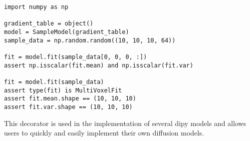 \begin{verbatim}
import numpy as np

gradient_table = object()
model = SampleModel(gradient_table)
sample_data = np.random.random((10, 10, 10, 64))

fit = model.fit(sample_data[0, 0, 0, :])
assert np.isscalar(fit.mean) and np.isscalar(fit.var)

fit = model.fit(sample_data)
assert type(fit) is MultiVoxelFit
assert fit.mean.shape == (10, 10, 10)
assert fit.var.shape == (10, 10, 10)
\end{verbatim}

This decorator is used in the implementation of several dipy models and allows users to quickly and easily implement their own diffusion models.